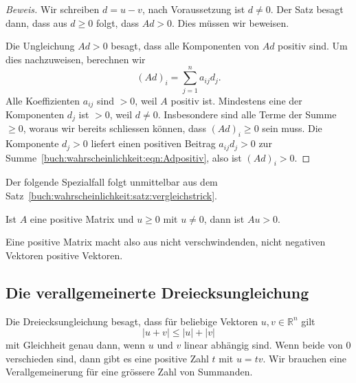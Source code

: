 \begin{proof}[Beweis]
Wir schreiben $d=u-v$, nach Voraussetzung ist $d\ne 0$.
Der Satz besagt dann, dass aus $d\ge 0$ folgt, dass $Ad>0$.
Dies müssen wir beweisen.

Die Ungleichung $Ad>0$ besagt, dass alle Komponenten von $Ad$ 
positiv sind.
Um dies nachzuweisen, berechnen wir
\begin{equation}
(Ad)_i
=
\sum_{j=1}^n
a_{i\!j}
d_j.
\label{buch:wahrscheinlichkeit:eqn:Adpositiv}
\end{equation}
Alle Koeffizienten  $a_{i\!j}$ sind $>0$, weil $A$ positiv ist.
Mindestens eine der Komponenten $d_j$ ist $>0$, weil $d\ne 0$.
Insbesondere sind alle Terme der Summe $\ge 0$, woraus wir
bereits schliessen können, dass $(Ad)_i\ge 0$ sein muss.
Die Komponente $d_j>0$ liefert einen positiven Beitrag
$a_{i\!j}d_j>0$
zur Summe~\eqref{buch:wahrscheinlichkeit:eqn:Adpositiv},
also ist $(Ad)_i>0$.
\end{proof}

Der folgende Spezialfall folgt unmittelbar aus dem
Satz~\ref{buch:wahrscheinlichkeit:satz:vergleichstrick}.

\begin{korollar}
\label{buch:wahrscheinlichkeit:satz:Au>0korollar}
Ist $A$ eine positive Matrix und $u\ge 0$ mit $u\ne 0$, dann
ist $Au>0$.
\end{korollar}

Eine positive Matrix macht also aus nicht verschwindenden,
nicht negativen Vektoren positive Vektoren.

%
%
\subsection{Die verallgemeinerte Dreiecksungleichung
\label{buch:subsection:verallgemeinerte-dreiecksungleichung}}
Die Dreiecksungleichung besagt, dass für beliebige Vektoren
$u,v\in\mathbb{R}^n$ gilt
\[
|u+v|\le |u|+|v|
\]
mit Gleichheit genau dann, wenn $u$ und $v$ linear abhängig sind.
Wenn beide von $0$ verschieden sind, dann gibt es eine positive Zahl
$t$ mit $u=tv$.
Wir brauchen eine Verallgemeinerung für eine grössere Zahl von
Summanden.

